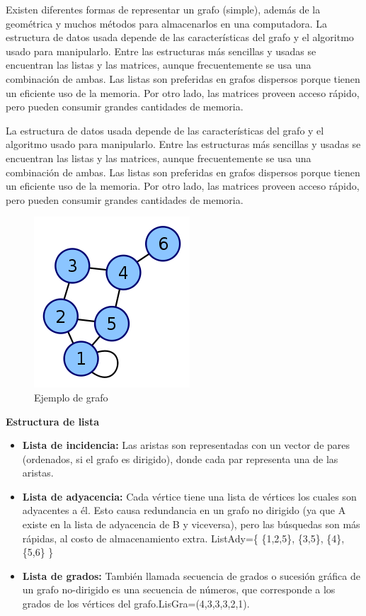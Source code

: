 Existen diferentes formas de representar un grafo (simple), además de la geométrica y muchos métodos para almacenarlos en una computadora. La estructura de datos usada depende de las características del grafo y el algoritmo usado para manipularlo. Entre las estructuras más sencillas y usadas se encuentran las listas y las matrices, aunque frecuentemente se usa una combinación de ambas. Las listas son preferidas en grafos dispersos porque tienen un eficiente uso de la memoria. Por otro lado, las matrices proveen acceso rápido, pero pueden consumir grandes cantidades de memoria.

La estructura de datos usada depende de las características del grafo y el algoritmo usado para manipularlo. Entre las estructuras más sencillas y usadas se encuentran las listas y las matrices, aunque frecuentemente se usa una combinación de ambas. Las listas son preferidas en grafos dispersos porque tienen un eficiente uso de la memoria. Por otro lado, las matrices proveen acceso rápido, pero pueden consumir grandes cantidades de memoria.

\begin{figure}[h]
	\centering 
	\includegraphics[scale=0.6]{img/graph}
	\caption{Ejemplo de grafo}
	\label{contexto:figura1}
\end{figure}

{\bf Estructura de lista}
\begin{itemize}
	\item {\bf Lista de incidencia:} Las aristas son representadas con un vector de pares (ordenados, si el grafo es dirigido), donde cada par representa una de las aristas.
	\item {\bf Lista de adyacencia:} Cada vértice tiene una lista de vértices los cuales son adyacentes a él. Esto causa redundancia en un grafo no dirigido (ya que A existe en la lista de adyacencia de B y viceversa), pero las búsquedas son más rápidas, al costo de almacenamiento extra. ListAdy=\{ \{1,2,5\}, \{3,5\}, \{4\}, \{5,6\} \}
	\item {\bf Lista de grados:} También llamada secuencia de grados o sucesión gráfica de un grafo no-dirigido es una secuencia de números, que corresponde a los grados de los vértices del grafo.LisGra=(4,3,3,3,2,1).
\end{itemize}

